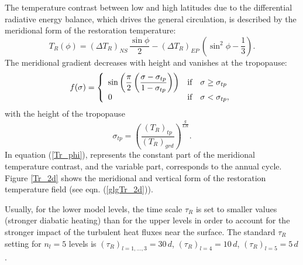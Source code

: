 The temperature contrast between low and high latitudes due to the differential 
radiative energy balance, which drives the general circulation, is described by 
the meridional form of the restoration temperature:
\begin{equation}
\label{Tr_phi}
T_R(\phi) = (\Delta T_R)_{NS}\, \frac{\sin\phi}{2}-(\Delta T_R)_{EP}\, \left(\sin^2\phi-\frac{1}{3}\right).
\end{equation}
The meridional gradient decreases with height and vanishes at the tropopause:
\begin{equation}
f(\sigma) = \left\{\ba{ll}
\di\sin\left(\frac{\pi}{2}\left(\frac{\sigma-\sigma_{tp}}{1-\sigma_{tp}}\right)\right) &
\mbox{if}\quad\sigma\ge\sigma_{tp} \\
0 &\mbox{if}\quad\sigma<\sigma_{tp},
\ea\right.
\end{equation}
with the height of the tropopause
\begin{equation}
\sigma_{tp} = \left(\frac{(T_R)_{tp}}{(T_R)_{grd}}\right)^{\frac{g}{LR}}.
\end{equation}
In equation (\ref{Tr_phi}), \dtepE represents the constant part of the meridional 
temperature contrast, and \dtns the variable part, corresponds to the annual cycle. 
Figure \ref{Tr_2d} shows the meridional and vertical form of the restoration 
temperature field (see eqn. (\ref{glgTr_2d})).


Usually, for the lower model levels, the time scale $\tau_R$ is set to smaller values 
(stronger diabatic heating) than for the upper levels in order to account for the 
stronger impact of the turbulent heat fluxes near the surface. The standard $\tau_R$ setting 
for $n_l=5$ levels is $(\tau_R)_{l=1,\ldots,3}=30\,d$, $(\tau_R)_{l=4}=10\,d$, 
$(\tau_R)_{l=5}=5\,d$.

